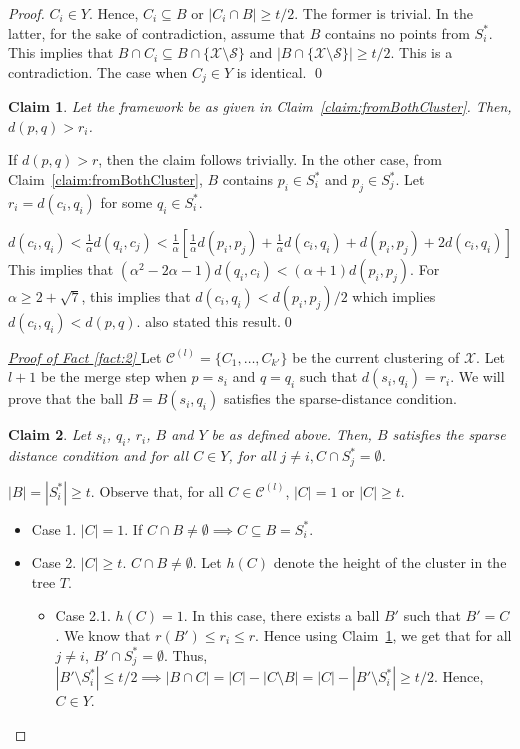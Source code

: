\documentclass[12pt]{article}
\newtheorem{smallLemma}{Claim}
\newcommand{\mc}{\mathcal}
\begin{document}
\begin{proof}
$C_i \in Y$. Hence, $C_i \subseteq B$ or $|C_i \cap B| \ge t/2$. The former is trivial. In the latter, for the sake of contradiction, assume that $B$ contains no points from $S_i^*$. This implies that $B \cap C_i \subseteq B \cap \{\mc X \setminus \mc S\}$ and $|B\cap \{\mc X \setminus \mc S\}| \ge t/2$. This  is a contradiction. The case when $C_j \in Y$ is identical. \qed

\begin{smallLemma}
\label{claim:maxrirj}
Let the framework be as given in Claim~\ref{claim:fromBothCluster}. Then, $d(p, q) > r_i$.
\end{smallLemma}

\vspace{-0.1in} \noindent If $d(p, q) > r$, then the claim follows trivially. In the other case, from Claim~\ref{claim:fromBothCluster}, $B$ contains $p_i \in S_i^*$ and $p_j \in S_j^*$. Let $r_i = d(c_i, q_i)$ for some $q_i \in S_i^*$.

$d(c_i, q_i) < \frac{1}{\alpha} d(q_i, c_j) < \frac{1}{\alpha} [ \frac{1}{\alpha}d(p_i, p_j) + \frac{1}{\alpha}d(c_i, q_i) + d(p_i, p_j) + 2d(c_i, q_i)]$
This implies that $(\alpha^2 - 2\alpha - 1)d(q_i, c_i) < (\alpha + 1) d(p_i, p_j)$. For $\alpha \ge 2 + \sqrt 7$, this implies that $d(c_i, q_i) < d(p_i, p_j)/2$ which implies $d(c_i, q_i) < d(p, q)$. \cite{balcan2012clustering} also stated this result.\qed

\noindent\textit{\underline{Proof of Fact \ref{fact:2}
}}
Let $\mc C^{(l)} = \{C_1, \ldots, C_{k'}\}$ be the current clustering of $\mc X$. Let $l+1$ be the merge step when $p = s_i$ and $q = q_i$ such that $d(s_i, q_i) = r_i$. We will prove that the ball $B = B(s_i, q_i)$ satisfies the sparse-distance condition.

\begin{smallLemma}
\label{claim:dciqi}
Let $s_i$, $q_i$, $r_i$, $B$ and $Y$ be as defined above. Then, $B$ satisfies the sparse distance condition and for all $C \in Y$, for all $j \neq i, C \cap S_j^* = \emptyset$.
\end{smallLemma}
\vspace{-0.1in} $|B| = |S_i^*| \ge t$. Observe that, for all $C \in \mc C^{(l)}$, $|C| = 1$ or $|C| \ge t$. 

\begin{itemize}[nolistsep,leftmargin=*]
\item Case 1. $|C| = 1$. If $C \cap B \neq \emptyset \implies C \subseteq B = S_i^*$.
\item Case 2. $|C|\ge t$. $C \cap B \neq \emptyset$. Let $h(C)$ denote the height of the cluster in the tree $T$. 
\begin{itemize}[leftmargin=*]
\renewcommand\labelitemii{$\circ$}
\item Case 2.1. $h(C) = 1$. In this case, there exists a ball $B'$ such that $B' = C$. We know that $r(B') \le r_i \le r$. Hence using Claim~\ref{claim:maxrirj}, we get that for all $j \neq i$, $B' \cap S_j^* = \emptyset$. Thus, $|B'\setminus S_i^*| \le t/2 \implies |B\cap C| = |C| - |C\setminus B| = |C| - |B'\setminus S_i^*| \ge t/2$. Hence, $C \in Y$.


\end{itemize}
\end{itemize}
\end{proof}
\end{document}
